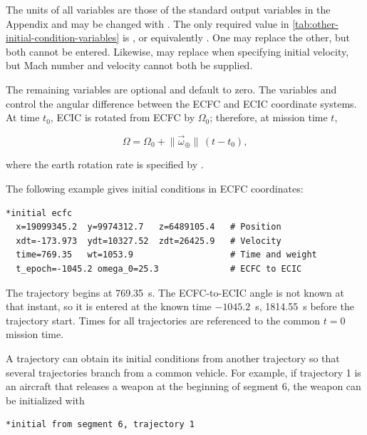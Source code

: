 The units of all variables are those of the standard output variables in the Appendix
and may be changed with . The only required value in
\cref{tab:other-initial-condition-variables} is , or equivalently
. One may replace the other, but both cannot be entered. Likewise,
 may replace  when specifying initial velocity, but
Mach number and velocity cannot both be supplied.

The remaining variables are optional and default to zero. The variables
 and  control the angular difference between the
ECFC and ECIC coordinate systems. At time $t_0$, ECIC is rotated from ECFC by
$\Omega_0$; therefore, at mission time $t$,

\begin{equation}
  \Omega = \Omega_0 + \lVert\vec\omega_{\oplus}\rVert\,(t-t_0),
  \label{eq:initial-ecic-rotation}
\end{equation}

where the earth rotation rate is specified by .

The following example gives initial conditions in ECFC coordinates:

\begin{lstlisting}[style=taosmanual]
*initial ecfc
  x=19099345.2  y=9974312.7   z=6489105.4   # Position
  xdt=-173.973  ydt=10327.52  zdt=26425.9   # Velocity
  time=769.35   wt=1053.9                   # Time and weight
  t_epoch=-1045.2 omega_0=25.3              # ECFC to ECIC
\end{lstlisting}

The trajectory begins at 769.35~s. The ECFC-to-ECIC angle is not known at that
instant, so it is entered at the known time $-1045.2$~s, 1814.55~s before the
trajectory start. Times for all trajectories are referenced to the common $t=0$
mission time.


A trajectory can obtain its initial conditions from another trajectory so that several
trajectories branch from a common vehicle. For example, if trajectory 1 is an aircraft
that releases a weapon at the beginning of segment 6, the weapon can be initialized
with

\begin{lstlisting}[style=taosmanual]
*initial from segment 6, trajectory 1
\end{lstlisting}

